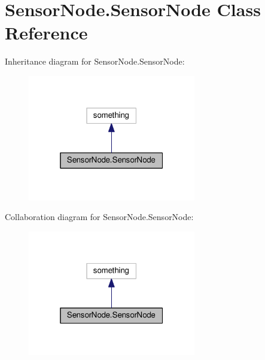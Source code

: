 \hypertarget{classSensorNode_1_1SensorNode}{}\section{Sensor\+Node.\+Sensor\+Node Class Reference}
\label{classSensorNode_1_1SensorNode}


Inheritance diagram for Sensor\+Node.\+Sensor\+Node\+:
\nopagebreak
\begin{figure}[H]
\begin{center}
\leavevmode
\includegraphics[width=208pt]{classSensorNode_1_1SensorNode__inherit__graph}
\end{center}
\end{figure}


Collaboration diagram for Sensor\+Node.\+Sensor\+Node\+:
\nopagebreak
\begin{figure}[H]
\begin{center}
\leavevmode
\includegraphics[width=208pt]{classSensorNode_1_1SensorNode__coll__graph}
\end{center}
\end{figure}
